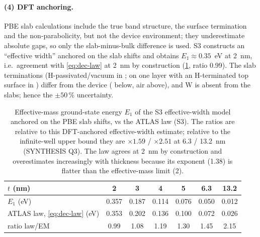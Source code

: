 \paragraph{(4) DFT anchoring.}
PBE slab calculations include the true band structure, the surface termination and the non-parabolicity, but
not the device environment; they underestimate absolute gaps, so only the slab-minus-bulk difference is used.
S3 constructs an ``effective width'' anchored on the slab shifts and obtains $E_1 \approx 0.35$~eV at 2~nm,
i.e.\ agreement with \cref{eq:dec-law} at 2~nm by construction (\cref{tab:d1-e1}, ratio 0.99). The slab
terminations (H-passivated/vacuum in \citealp[p.~21542]{Lin2022}; \InO{} on one \AlO{} layer with an H-terminated top surface in
\citealp[pp.~504--505]{Si2021})
differ from the device (\AlO{} below, air above), and W is absent from the slabs; hence the $\pm50$\,\%
uncertainty.

\begin{table}[tbp]
  \centering\small
  \caption{Effective-mass ground-state energy $E_1$ of the S3 effective-width model anchored on the PBE slab
  shifts, vs the ATLAS law (S3). The ratios are relative to this DFT-anchored effective-width estimate; relative to the
  infinite-well upper bound they are $\times1.59$ / $\times2.51$ at 6.3 / 13.2~nm (SYNTHESIS Q3). The law agrees at 2~nm by construction and overestimates increasingly with
  thickness because its exponent (1.38) is flatter than the effective-mass limit (2).}
  \label{tab:d1-e1}
  \begin{tabular}{lcccccc}
    \toprule
    $t$ (nm) & 2 & 3 & 4 & 5 & 6.3 & 13.2 \\
    \midrule
    $E_1$ (eV) & 0.357 & 0.187 & 0.114 & 0.076 & 0.050 & 0.012 \\
    ATLAS law, \cref{eq:dec-law} (eV) & 0.353 & 0.202 & 0.136 & 0.100 & 0.072 & 0.026 \\
    ratio law/EM & 0.99 & 1.08 & 1.19 & 1.30 & 1.45 & 2.15 \\
    \bottomrule
  \end{tabular}
\end{table}


